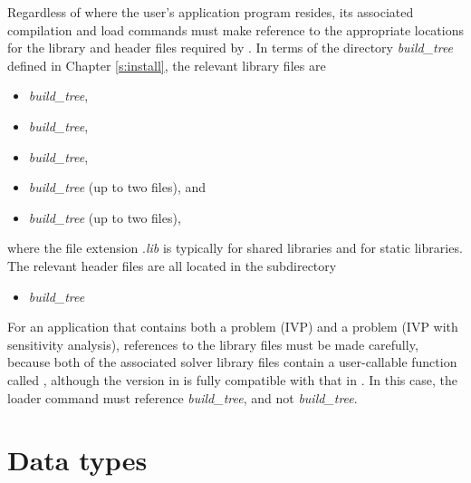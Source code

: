Regardless of where the user's application program resides, its
associated compilation and load commands must make reference to the
appropriate locations for the library and header files required by
{\cvode}.  In terms of the directory {\em build\_tree} defined in
Chapter \ref{s:install}, the relevant library files are
\begin{itemize}
\item {\em build\_tree},
\item {\em build\_tree},
\item {\em build\_tree},
\item {\em build\_tree} (up to two files), and
\item {\em build\_tree} (up to two files),
\end{itemize}
where the file extension .{\em lib} is typically  for shared libraries
and  for static libraries. The relevant header files are all located in
the subdirectory
\begin{itemize}
\item {\em build\_tree}
\end{itemize}

For an application that contains both a {\cvode} problem (IVP) and a
{\cvodes} problem (IVP with sensitivity analysis), 
references to the library files must be made carefully, because both
of the associated solver library files contain a user-callable
function called , although the version in {\cvodes} is fully
compatible with that in {\cvode}.  In this case, the loader command
must reference {\em build\_tree}, and not 
{\em build\_tree}.

\section{Data types}\label{s:types}


